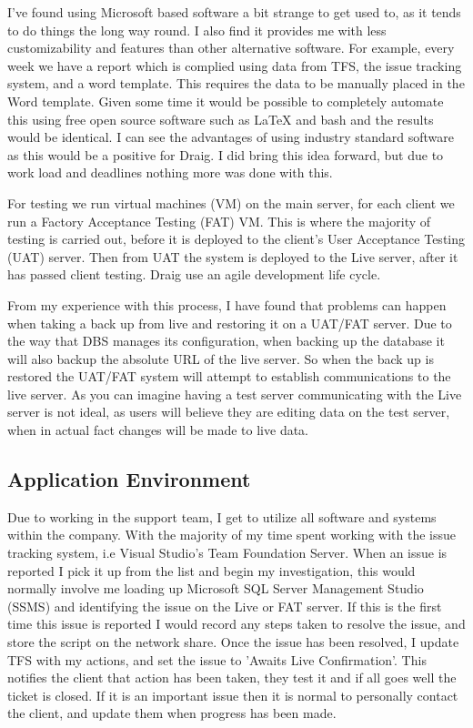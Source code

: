 \documentclass[paper=a4, fontsize=11pt]{scrartcl}	%
\begin{document}
I've found using Microsoft based software a bit strange to get used to, as it tends to do things the long way round. I also find it provides me with less customizability and features than other alternative software. For example, every week we have a report which is complied using data from TFS, the issue tracking system, and a word template. This requires the data to be manually placed in the Word template. Given some time it would be possible to completely automate this using free open source software such as LaTeX and bash and the results would be identical. I can see the advantages of using industry standard software as this would be a positive for Draig. I did bring this idea forward, but due to work load and deadlines nothing more was done with this.

For testing we run virtual machines (VM) on the main server, for each client we run a Factory Acceptance Testing (FAT) VM. This is where the majority of testing is carried out, before it is deployed to the client's User Acceptance Testing (UAT) server. Then from UAT the system is deployed to the Live server, after it has passed client testing. Draig use an agile development life cycle. 

From my experience with this process, I have found that problems can happen when taking a back up from live and restoring it on a UAT/FAT server. Due to the way that DBS manages its configuration, when backing up the database it will also backup the absolute URL of the live server. So when the back up is restored the UAT/FAT system will attempt to establish communications to the live server. As you can imagine having a test server communicating with the Live server is not ideal, as users will believe they are editing data on the test server, when in actual fact changes will be made to live data.

\subsection{Application Environment}
Due to working in the support team, I get to utilize all software and systems within the company.
With the majority of my time spent working with the issue tracking system, i.e Visual Studio's Team Foundation Server. When an issue is reported I pick it up from the list and begin my investigation, this would normally involve me loading up Microsoft SQL Server Management Studio (SSMS) and identifying the issue on the Live or FAT server. If this is the first time this issue is reported I would record any steps taken to resolve the issue, and store the script on the network share. Once the issue has been resolved, I update TFS with my actions, and set the issue to 'Awaits Live Confirmation'. This notifies the client that action has been taken, they test it and if all goes well the ticket is closed.
If it is an important issue then it is normal to personally contact the client, and update them when progress has been made.
\end{document}
